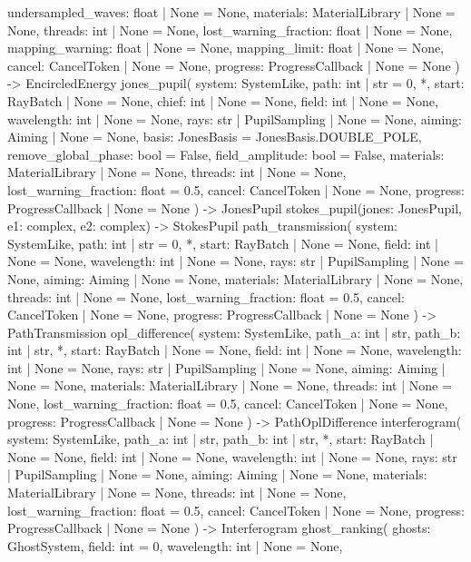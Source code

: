\documentclass[11pt,a4paper,openany]{book}
\begin{document}
\begin{signatur}
    undersampled_waves: float | None = None,
    materials: MaterialLibrary | None = None,
    threads: int | None = None,
    lost_warning_fraction: float | None = None,
    mapping_warning: float | None = None,
    mapping_limit: float | None = None,
    cancel: CancelToken | None = None,
    progress: ProgressCallback | None = None
) -> EncircledEnergy
jones_pupil(
    system: SystemLike,
    path: int | str = 0,
    *,
    start: RayBatch | None = None,
    chief: int | None = None,
    field: int | None = None,
    wavelength: int | None = None,
    rays: str | PupilSampling | None = None,
    aiming: Aiming | None = None,
    basis: JonesBasis = JonesBasis.DOUBLE_POLE,
    remove_global_phase: bool = False,
    field_amplitude: bool = False,
    materials: MaterialLibrary | None = None,
    threads: int | None = None,
    lost_warning_fraction: float = 0.5,
    cancel: CancelToken | None = None,
    progress: ProgressCallback | None = None
) -> JonesPupil
stokes_pupil(jones: JonesPupil, e1: complex, e2: complex) -> StokesPupil
path_transmission(
    system: SystemLike,
    path: int | str = 0,
    *,
    start: RayBatch | None = None,
    field: int | None = None,
    wavelength: int | None = None,
    rays: str | PupilSampling | None = None,
    aiming: Aiming | None = None,
    materials: MaterialLibrary | None = None,
    threads: int | None = None,
    lost_warning_fraction: float = 0.5,
    cancel: CancelToken | None = None,
    progress: ProgressCallback | None = None
) -> PathTransmission
opl_difference(
    system: SystemLike,
    path_a: int | str,
    path_b: int | str,
    *,
    start: RayBatch | None = None,
    field: int | None = None,
    wavelength: int | None = None,
    rays: str | PupilSampling | None = None,
    aiming: Aiming | None = None,
    materials: MaterialLibrary | None = None,
    threads: int | None = None,
    lost_warning_fraction: float = 0.5,
    cancel: CancelToken | None = None,
    progress: ProgressCallback | None = None
) -> PathOplDifference
interferogram(
    system: SystemLike,
    path_a: int | str,
    path_b: int | str,
    *,
    start: RayBatch | None = None,
    field: int | None = None,
    wavelength: int | None = None,
    rays: str | PupilSampling | None = None,
    aiming: Aiming | None = None,
    materials: MaterialLibrary | None = None,
    threads: int | None = None,
    lost_warning_fraction: float = 0.5,
    cancel: CancelToken | None = None,
    progress: ProgressCallback | None = None
) -> Interferogram
ghost_ranking(
    ghosts: GhostSystem,
    field: int = 0,
    wavelength: int | None = None,

\end{signatur}
\end{document}
